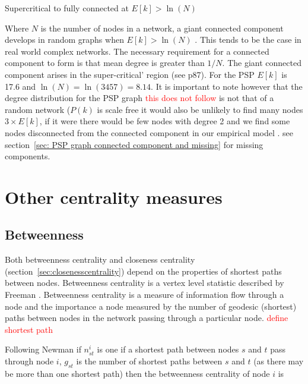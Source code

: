 Supercritical to fully connected at $E[k] > \ln(N)$


Where $N$ is the number of nodes in a network, a giant connected component develops in random graphs when $E[k] > \ln (N)$ \cite{barabasi2016network}. This tends to be the case in real world complex networks. The necessary requirement for a connected component to form is that mean degree is greater than $1/N$. The giant connected component arises in the super-critical' region (see \cite{barabasi2016network} p87). For the PSP $E[k]$ is 17.6 and $\ln(N)=\ln(3457)=8.14$.  It is important to note however that the degree distribution for the PSP graph \textcolor{red}{this does not follow} is not that of a random network ($P(k)$ is scale free it would also be unlikely to find many nodes $ 3 \times E[k]$, if it were there would be few nodes with degree 2 and we find some nodes disconnected from the connected component in our empirical model .   see section~\ref{sec: PSP graph connected component and missing} for missing components.





\section{Other centrality measures}

\subsection{Betweenness}
\label{sec:Betweeness centrality}
Both betweenness centrality and closeness centrality (section~\ref{sec:closenesscentrality}) depend on the properties of shortest paths between nodes. Betweenness centrality is a vertex level statistic described by Freeman \cite{freeman1977set}. Betweenness centrality is a measure of information flow through a node and the importance a node measured by the number of geodesic (shortest) paths between nodes in the network passing through a particular node. \textcolor{red}{define shortest path}

 Following Newman if $n_{st}^i$ is one if a shortest path between nodes $s$ and $t$ pass through node $i$, $g_{st}$ is the number of shortest paths between $s$ and $t$ (as there may be more than one shortest path) then the betweenness centrality of node $i$ is

